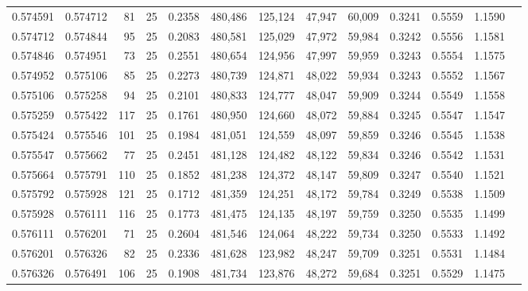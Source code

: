 \begin{tabular}{rrrrrrrrrrrrr}
0.574591 & 0.574712 &    81 &  25 &                                     0.2358 & 480,486 & 125,124 &  47,947 &  60,009 & 0.3241 & 0.5559 & 1.1590 \\
0.574712 & 0.574844 &    95 &  25 &                                     0.2083 & 480,581 & 125,029 &  47,972 &  59,984 & 0.3242 & 0.5556 & 1.1581 \\
0.574846 & 0.574951 &    73 &  25 &                                     0.2551 & 480,654 & 124,956 &  47,997 &  59,959 & 0.3243 & 0.5554 & 1.1575 \\
0.574952 & 0.575106 &    85 &  25 &                                     0.2273 & 480,739 & 124,871 &  48,022 &  59,934 & 0.3243 & 0.5552 & 1.1567 \\
0.575106 & 0.575258 &    94 &  25 &                                     0.2101 & 480,833 & 124,777 &  48,047 &  59,909 & 0.3244 & 0.5549 & 1.1558 \\
0.575259 & 0.575422 &   117 &  25 &                                     0.1761 & 480,950 & 124,660 &  48,072 &  59,884 & 0.3245 & 0.5547 & 1.1547 \\
0.575424 & 0.575546 &   101 &  25 &                                     0.1984 & 481,051 & 124,559 &  48,097 &  59,859 & 0.3246 & 0.5545 & 1.1538 \\
0.575547 & 0.575662 &    77 &  25 &                                     0.2451 & 481,128 & 124,482 &  48,122 &  59,834 & 0.3246 & 0.5542 & 1.1531 \\
0.575664 & 0.575791 &   110 &  25 &                                     0.1852 & 481,238 & 124,372 &  48,147 &  59,809 & 0.3247 & 0.5540 & 1.1521 \\
0.575792 & 0.575928 &   121 &  25 &                                     0.1712 & 481,359 & 124,251 &  48,172 &  59,784 & 0.3249 & 0.5538 & 1.1509 \\
0.575928 & 0.576111 &   116 &  25 &                                     0.1773 & 481,475 & 124,135 &  48,197 &  59,759 & 0.3250 & 0.5535 & 1.1499 \\
0.576111 & 0.576201 &    71 &  25 &                                     0.2604 & 481,546 & 124,064 &  48,222 &  59,734 & 0.3250 & 0.5533 & 1.1492 \\
0.576201 & 0.576326 &    82 &  25 &                                     0.2336 & 481,628 & 123,982 &  48,247 &  59,709 & 0.3251 & 0.5531 & 1.1484 \\
0.576326 & 0.576491 &   106 &  25 &                                     0.1908 & 481,734 & 123,876 &  48,272 &  59,684 & 0.3251 & 0.5529 & 1.1475 \\

\end{tabular}
